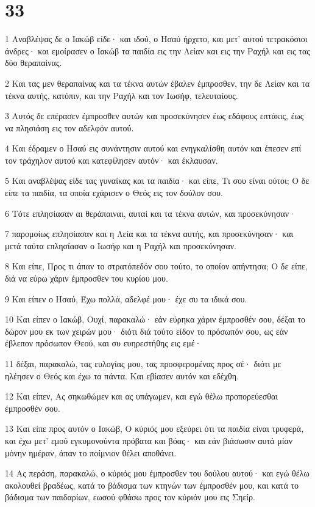 \chapter{33}

\par 1 Αναβλέψας δε ο Ιακώβ είδε· και ιδού, ο Ησαύ ήρχετο, και μετ' αυτού τετρακόσιοι άνδρες· και εμοίρασεν ο Ιακώβ τα παιδία εις την Λείαν και εις την Ραχήλ και εις τας δύο θεραπαίνας.
\par 2 Και τας μεν θεραπαίνας και τα τέκνα αυτών έβαλεν έμπροσθεν, την δε Λείαν και τα τέκνα αυτής, κατόπιν, και την Ραχήλ και τον Ιωσήφ, τελευταίους.
\par 3 Αυτός δε επέρασεν έμπροσθεν αυτών και προσεκύνησεν έως εδάφους επτάκις, έως να πλησιάση εις τον αδελφόν αυτού.
\par 4 Και έδραμεν ο Ησαύ εις συνάντησιν αυτού και ενηγκαλίσθη αυτόν και έπεσεν επί τον τράχηλον αυτού και κατεφίλησεν αυτόν· και έκλαυσαν.
\par 5 Και αναβλέψας είδε τας γυναίκας και τα παιδία· και είπε, Τι σου είναι ούτοι; Ο δε είπε τα παιδία, τα οποία εχάρισεν ο Θεός εις τον δούλον σου.
\par 6 Τότε επλησίασαν αι θεράπαιναι, αυταί και τα τέκνα αυτών, και προσεκύνησαν·
\par 7 παρομοίως επλησίασαν και η Λεία και τα τέκνα αυτής, και προσεκύνησαν· και μετά ταύτα επλησίασαν ο Ιωσήφ και η Ραχήλ και προσεκύνησαν.
\par 8 Και είπε, Προς τι άπαν το στρατόπεδόν σου τούτο, το οποίον απήντησα; Ο δε είπε, διά να εύρω χάριν έμπροσθεν του κυρίου μου.
\par 9 Και είπεν ο Ησαύ, Έχω πολλά, αδελφέ μου· έχε συ τα ιδικά σου.
\par 10 Και είπεν ο Ιακώβ, Ουχί, παρακαλώ· εάν εύρηκα χάριν έμπροσθέν σου, δέξαι το δώρον μου εκ των χειρών μου· διότι διά τούτο είδον το πρόσωπόν σου, ως εάν έβλεπον πρόσωπον Θεού, και συ ευηρεστήθης εις εμέ·
\par 11 δέξαι, παρακαλώ, τας ευλογίας μου, τας προσφερομένας προς σέ· διότι με ηλέησεν ο Θεός και έχω τα πάντα. Και εβίασεν αυτόν και εδέχθη.
\par 12 Και είπεν, Ας σηκωθώμεν και ας υπάγωμεν, και εγώ θέλω προπορεύεσθαι έμπροσθέν σου.
\par 13 Και είπε προς αυτόν ο Ιακώβ, Ο κύριός μου εξεύρει ότι τα παιδία είναι τρυφερά, και έχω μετ' εμού εγκυμονούντα πρόβατα και βόας· και εάν βιάσωσιν αυτά μίαν μόνην ημέραν, άπαν το ποίμνιον θέλει αποθάνει.
\par 14 Ας περάση, παρακαλώ, ο κύριός μου έμπροσθεν του δούλου αυτού· και εγώ θέλω ακολουθεί βραδέως, κατά το βάδισμα των κτηνών των έμπροσθέν μου, και κατά το βάδισμα των παιδαρίων, εωσού φθάσω προς τον κύριόν μου εις Σηείρ.
